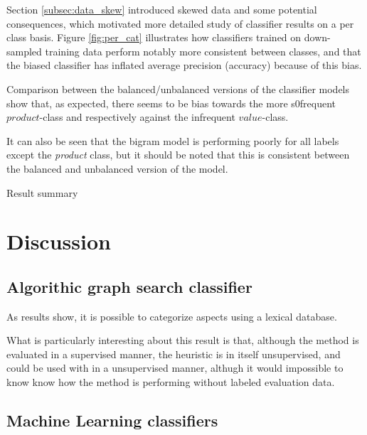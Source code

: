 \documentclass[a4paper,11pt]{kth-mag}
\begin{document}
Section \ref{subsec:data_skew} introduced skewed data and some potential consequences, which motivated more detailed study of classifier results on a per class basis. Figure \ref{fig:per_cat} illustrates how classifiers trained on
down-sampled training data perform notably more consistent between classes, and that the biased classifier has inflated average precision (accuracy) because of this bias.

Comparison between the balanced/unbalanced versions of the classifier models show that, as expected, there seems to be bias towards the more s0frequent $product$-class and respectively against the infrequent $value$-class.

It can also be seen that the bigram model is performing poorly for all labels except the \emph{product} class, but it should be noted that this is consistent between the balanced and unbalanced version of the model.


\begin{table}[h]
  \centering

  \vspace{0.4cm}\caption{Result summary}
  \label{general_asp}
\end{table}

\clearpage
\section{Discussion}
\subsection{Algorithic graph search classifier}
As results show, it is possible to categorize aspects using a lexical database.

What is particularly interesting about this result is that, although the method is evaluated in a supervised
manner, the heuristic is in itself unsupervised, and could be used with in a unsupervised manner, althugh it would impossible to know know how the method is performing without labeled evaluation data.

\subsection{Machine Learning classifiers}
\end{document}
